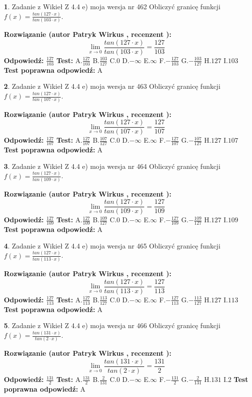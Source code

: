 \documentclass[12pt, a4paper]{article}
\theoremstyle{definition} %
\newtheorem{zad}{}
\newcommand{\zadStart}[1]{\begin{zad}#1\newline}
\newcommand{\zadStop}{\end{zad}}
\newcommand{\rozwStart}[2]{\noindent \textbf{Rozwiązanie (autor #1 , recenzent #2): }\newline}
\newcommand{\rozwStop}{\newline}
\newcommand{\odpStart}{\noindent \textbf{Odpowiedź:}\newline}
\newcommand{\odpStop}{\newline}
\newcommand{\testStart}{\noindent \textbf{Test:}\newline}
\newcommand{\testStop}{\newline}
\newcommand{\kluczStart}{\noindent \textbf{Test poprawna odpowiedź:}\newline}
\newcommand{\kluczStop}{\newline}
\begin{document}
\zadStart{Zadanie z Wikieł Z 4.4 e) moja wersja nr 462}
Obliczyć granicę funkcji $f(x)=\frac{tan(127\cdot x)}{tan(103\cdot x)}$.
\zadStop
\rozwStart{Patryk Wirkus}{}
$$\lim\limits_{x\to 0}\frac{tan(127\cdot x)}{tan(103\cdot x)}=
\frac{127}{103}$$
\rozwStop
\odpStart
$\frac{127}{103}$
\odpStop
\testStart
A.$\frac{127}{103}$
B.$\frac{103}{127}$
C.$0$
D.$-\infty$
E.$\infty$
F.$-\frac{127}{103}$
G.$-\frac{103}{127}$
H.$127$
I.$103$
\testStop
\kluczStart
A
\kluczStop



\zadStart{Zadanie z Wikieł Z 4.4 e) moja wersja nr 463}
Obliczyć granicę funkcji $f(x)=\frac{tan(127\cdot x)}{tan(107\cdot x)}$.
\zadStop
\rozwStart{Patryk Wirkus}{}
$$\lim\limits_{x\to 0}\frac{tan(127\cdot x)}{tan(107\cdot x)}=
\frac{127}{107}$$
\rozwStop
\odpStart
$\frac{127}{107}$
\odpStop
\testStart
A.$\frac{127}{107}$
B.$\frac{107}{127}$
C.$0$
D.$-\infty$
E.$\infty$
F.$-\frac{127}{107}$
G.$-\frac{107}{127}$
H.$127$
I.$107$
\testStop
\kluczStart
A
\kluczStop



\zadStart{Zadanie z Wikieł Z 4.4 e) moja wersja nr 464}
Obliczyć granicę funkcji $f(x)=\frac{tan(127\cdot x)}{tan(109\cdot x)}$.
\zadStop
\rozwStart{Patryk Wirkus}{}
$$\lim\limits_{x\to 0}\frac{tan(127\cdot x)}{tan(109\cdot x)}=
\frac{127}{109}$$
\rozwStop
\odpStart
$\frac{127}{109}$
\odpStop
\testStart
A.$\frac{127}{109}$
B.$\frac{109}{127}$
C.$0$
D.$-\infty$
E.$\infty$
F.$-\frac{127}{109}$
G.$-\frac{109}{127}$
H.$127$
I.$109$
\testStop
\kluczStart
A
\kluczStop



\zadStart{Zadanie z Wikieł Z 4.4 e) moja wersja nr 465}
Obliczyć granicę funkcji $f(x)=\frac{tan(127\cdot x)}{tan(113\cdot x)}$.
\zadStop
\rozwStart{Patryk Wirkus}{}
$$\lim\limits_{x\to 0}\frac{tan(127\cdot x)}{tan(113\cdot x)}=
\frac{127}{113}$$
\rozwStop
\odpStart
$\frac{127}{113}$
\odpStop
\testStart
A.$\frac{127}{113}$
B.$\frac{113}{127}$
C.$0$
D.$-\infty$
E.$\infty$
F.$-\frac{127}{113}$
G.$-\frac{113}{127}$
H.$127$
I.$113$
\testStop
\kluczStart
A
\kluczStop



\zadStart{Zadanie z Wikieł Z 4.4 e) moja wersja nr 466}
Obliczyć granicę funkcji $f(x)=\frac{tan(131\cdot x)}{tan(2\cdot x)}$.
\zadStop
\rozwStart{Patryk Wirkus}{}
$$\lim\limits_{x\to 0}\frac{tan(131\cdot x)}{tan(2\cdot x)}=
\frac{131}{2}$$
\rozwStop
\odpStart
$\frac{131}{2}$
\odpStop
\testStart
A.$\frac{131}{2}$
B.$\frac{2}{131}$
C.$0$
D.$-\infty$
E.$\infty$
F.$-\frac{131}{2}$
G.$-\frac{2}{131}$
H.$131$
I.$2$
\testStop
\kluczStart
A
\kluczStop
\end{document}
